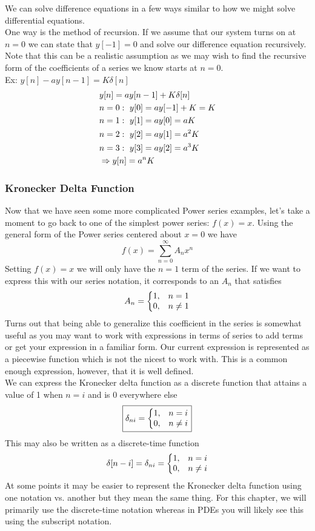\documentclass[11pt, fleqn]{article}
\begin{document}
We can solve difference equations in a few ways similar to how we might solve differential equations.\\
One way is the method of recursion. If we assume that our system turns on at $n=0$ we can state that $y[-1]=0$ and solve our difference equation recursively. Note that this can be a realistic assumption as we may wish to find the recursive form of the coefficients of a series we know starts at $n=0$.\\
Ex: $y[n]-ay[n-1]=K\delta[n]$
\begin{align*}
    &y[n]=ay[n-1]+K\delta[n]\\
    &n=0:\ y[0]=ay[-1]+K=K\\
    &n=1:\ y[1]=ay[0]=aK\\
    &n=2:\ y[2]=ay[1]=a^2K\\
    &n=3:\ y[3]=ay[2]=a^3K\\
    &\Rightarrow y[n]=a^nK
\end{align*}

\subsubsection{Kronecker Delta Function}
Now that we have seen some more complicated Power series examples, let's take a moment to go back to one of the simplest power series: $f(x)=x$. Using the general form of the Power series centered about $x=0$ we have
$$f(x)=\sum_{n=0}^\infty A_nx^n$$
Setting $f(x)=x$ we will only have the $n=1$ term of the series. If we want to express this with our series notation, it corresponds to an $A_n$ that satisfies
$$A_n=\left\{\begin{matrix} 1, & n=1\\ 0, & n\neq 1 \end{matrix}\right.$$
Turns out that being able to generalize this coefficient in the series is somewhat useful as you may want to work with expressions in terms of series to add terms or get your expression in a familiar form. Our current expression is represented as a piecewise function which is not the nicest to work with. This is a common enough expression, however, that it is well defined.\\
We can express the Kronecker delta function as a discrete function that attains a value of 1 when $n=i$ and is 0 everywhere else
$$\boxed{\delta_{ni}=\left\{\begin{matrix} 1, & n=i\\ 0, & n\neq i \end{matrix}\right.}$$
This may also be written as a discrete-time function
$$\delta[n-i]=\delta_{ni}=\left\{\begin{matrix} 1, & n=i\\ 0, & n\neq i \end{matrix}\right.$$
At some points it may be easier to represent the Kronecker delta function using one notation vs. another but they mean the same thing. For this chapter, we will primarily use the discrete-time notation whereas in PDEs you will likely see this using the subscript notation.\\
\end{document}

